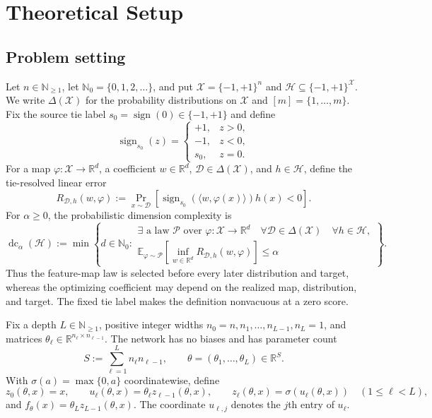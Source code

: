 \section{Theoretical Setup}
\label{sec:setup}

\subsection{Problem setting}

Let $n\in\mathbb N_{\geq1}$, let
$\mathbb N_0=\{0,1,2,\ldots\}$, and put
$\mathcal X=\{-1,+1\}^n$ and
$\mathcal H\subseteq\{-1,+1\}^{\mathcal X}$.  We write
$\Delta(\mathcal X)$ for the probability distributions on $\mathcal X$ and
$[m]=\{1,\ldots,m\}$.  Fix the source tie label
$s_0=\operatorname{sign}(0)\in\{-1,+1\}$ and define
\[
\operatorname{sign}_{s_0}(z)=
\begin{cases}
+1,&z>0,\\
-1,&z<0,\\
s_0,&z=0.
\end{cases}
\]
For a map $\varphi:\mathcal X\to\mathbb R^d$, a coefficient
$w\in\mathbb R^d$, $\mathcal D\in\Delta(\mathcal X)$, and
$h\in\mathcal H$, define the tie-resolved linear error
\[
R_{\mathcal D,h}(w,\varphi)
:=\Pr_{x\sim\mathcal D}\!\left[
\operatorname{sign}_{s_0}(\langle w,\varphi(x)\rangle)h(x)<0
\right].
\]
For $\alpha\geq0$, the probabilistic dimension complexity is
\[
\operatorname{dc}_{\alpha}(\mathcal H)
:=\min\left\{d\in\mathbb N_0:
\begin{array}{l}
\exists\text{ a law }\mathcal P\text{ over }
\varphi:\mathcal X\to\mathbb R^d\quad
\forall\mathcal D\in\Delta(\mathcal X)\quad\forall h\in\mathcal H,\\[1mm]
\displaystyle
\mathbb E_{\varphi\sim\mathcal P}\!\left[
\inf_{w\in\mathbb R^d}R_{\mathcal D,h}(w,\varphi)
\right]\leq\alpha
\end{array}
\right\}.
\tag{1}\label{eq:p1-i3-eq001}
\]
Thus the feature-map law is selected before every later distribution and
target, whereas the optimizing coefficient may depend on the realized map,
distribution, and target.  The fixed tie label makes the definition
nonvacuous at a zero score.

Fix a depth $L\in\mathbb N_{\geq1}$, positive integer widths
$n_0=n,n_1,\ldots,n_{L-1},n_L=1$, and matrices
$\theta_\ell\in\mathbb R^{n_\ell\times n_{\ell-1}}$.  The network has no
biases and has parameter count
\[
S:=\sum_{\ell=1}^{L}n_\ell n_{\ell-1},
\qquad
\theta=(\theta_1,\ldots,\theta_L)\in\mathbb R^S.
\tag{2}\label{eq:p1-i3-eq002}
\]
With $\sigma(a)=\max\{0,a\}$ coordinatewise, define
\[
z_0(\theta,x)=x,
\qquad
u_\ell(\theta,x)=\theta_\ell z_{\ell-1}(\theta,x),
\qquad
z_\ell(\theta,x)=\sigma(u_\ell(\theta,x))
\quad(1\leq\ell<L),
\]
and $f_\theta(x)=\theta_Lz_{L-1}(\theta,x)$.  The coordinate
$u_{\ell,j}$ denotes the $j$th entry of $u_\ell$.

